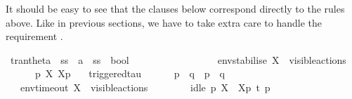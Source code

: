 \begin{isabellebody}
\begin{isamarkuptext}
It should be easy to see that the clauses below correspond directly to the rules above. Like in previous sections, we have to take extra care to handle the requirement .%
\end{isamarkuptext}\isamarkuptrue%
\isamarkupfalse%
\ tran{\isacharunderscore}{\kern0pt}theta\ {\isacharcolon}{\kern0pt}{\isacharcolon}{\kern0pt}\ {\isacartoucheopen}{\isacharprime}{\kern0pt}ss\ {\isasymRightarrow}\ {\isacharprime}{\kern0pt}a\ {\isasymRightarrow}\ {\isacharprime}{\kern0pt}ss\ {\isasymRightarrow}\ bool{\isacartoucheclose}\ \isanewline
\ \ {\isacharparenleft}{\kern0pt}{\isacartoucheopen}{\isacharunderscore}{\kern0pt}\ {\isasymlongmapsto}\isactrlsup {\isasymtheta}{\isacharunderscore}{\kern0pt}\ {\isacharunderscore}{\kern0pt}{\isacartoucheclose}\ {\isacharbrackleft}{\kern0pt}{}{}{\isacharcomma}{\kern0pt}\ {}{}{\isacharcomma}{\kern0pt}\ {}{}{\isacharbrackright}{\kern0pt}\ {}{}{\isacharparenright}{\kern0pt}\isanewline
\ \ \ \isanewline
\ \ \ \ env{\isacharunderscore}{\kern0pt}stabilise{\isacharcolon}{\kern0pt}\ {\isacartoucheopen}X\ {\isasymsubseteq}\ visible{\isacharunderscore}{\kern0pt}actions\ {\isasymLongrightarrow}\ \isanewline
\ \ \ \ \ \ {\isasymtheta}{\isacharparenleft}{\kern0pt}p{\isacharparenright}{\kern0pt}\ {\isasymlongmapsto}\isactrlsup {\isasymtheta}{\isasymepsilon}{\isacharbrackleft}{\kern0pt}X{\isacharbrackright}{\kern0pt}\ {\isasymtheta}{\isacharbrackleft}{\kern0pt}X{\isacharbrackright}{\kern0pt}{\isacharparenleft}{\kern0pt}p{\isacharparenright}{\kern0pt}{\isacartoucheclose}\isanewline
\ \ {\isacharbar}{\kern0pt}\ triggered{\isacharunderscore}{\kern0pt}tau{\isacharcolon}{\kern0pt}\isanewline
\ \ \ \ \ \ {\isacartoucheopen}p\ {\isasymlongmapsto}{\isasymtau}\ q\ {\isasymLongrightarrow}\ {\isasymtheta}{\isacharparenleft}{\kern0pt}p{\isacharparenright}{\kern0pt}\ {\isasymlongmapsto}\isactrlsup {\isasymtheta}{\isasymtau}\ {\isasymtheta}{\isacharparenleft}{\kern0pt}q{\isacharparenright}{\kern0pt}{\isacartoucheclose}\isanewline
\ \ {\isacharbar}{\kern0pt}\ env{\isacharunderscore}{\kern0pt}timeout{\isacharcolon}{\kern0pt}\ {\isacartoucheopen}X\ {\isasymsubseteq}\ visible{\isacharunderscore}{\kern0pt}actions\ {\isasymLongrightarrow}\ \isanewline
\ \ \ \ \ \ idle\ p\ X\ {\isasymLongrightarrow}\ {\isasymtheta}{\isacharbrackleft}{\kern0pt}X{\isacharbrackright}{\kern0pt}{\isacharparenleft}{\kern0pt}p{\isacharparenright}{\kern0pt}\ {\isasymlongmapsto}\isactrlsup {\isasymtheta}t{\isacharunderscore}{\kern0pt}{\isasymepsilon}\ {\isasymtheta}{\isacharparenleft}{\kern0pt}p{\isacharparenright}{\kern0pt}{\isacartoucheclose}\isanewline

\end{isabellebody}
